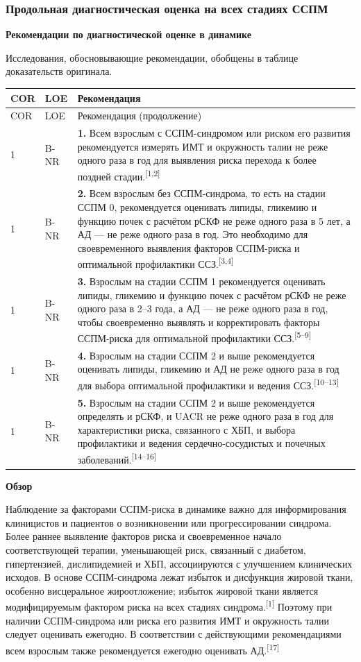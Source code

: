 \documentclass[11pt,a4paper]{article}
\newcommand{\src}[1]{\textsuperscript{[#1]}}
\newcommand{\heading}[1]{\par\medskip\textbf{#1}\par}
\begin{document}
\subsubsection{Продольная диагностическая оценка на всех стадиях ССПМ}
\heading{Рекомендации по диагностической оценке в динамике}
Исследования, обосновывающие рекомендации, обобщены в таблице доказательств оригинала.
{\small
\begin{longtable}{P{0.07\textwidth}P{0.11\textwidth}P{0.75\textwidth}}
\toprule COR & LOE & Рекомендация\\\midrule
\endfirsthead
\toprule COR & LOE & Рекомендация (продолжение)\\\midrule
{} & B-NR & \textbf{1.} Всем взрослым с ССПМ-синдромом или риском его развития рекомендуется измерять ИМТ и окружность талии не реже одного раза в год для выявления риска перехода к более поздней стадии.\src{1,2}\\[5pt]
1 & B-NR & \textbf{2.} Всем взрослым без ССПМ-синдрома, то есть на стадии ССПМ 0, рекомендуется оценивать липиды, гликемию и функцию почек с расчётом рСКФ не реже одного раза в 5 лет, а АД --- не реже одного раза в год. Это необходимо для своевременного выявления факторов ССПМ-риска и оптимальной профилактики ССЗ.\src{3,4}\\[5pt]
1 & B-NR & \textbf{3.} Взрослым на стадии ССПМ 1 рекомендуется оценивать липиды, гликемию и функцию почек с расчётом рСКФ не реже одного раза в 2--3 года, а АД --- не реже одного раза в год, чтобы своевременно выявлять и корректировать факторы ССПМ-риска для оптимальной профилактики ССЗ.\src{5--9}\\[5pt]
1 & B-NR & \textbf{4.} Взрослым на стадии ССПМ 2 и выше рекомендуется оценивать липиды, гликемию и АД не реже одного раза в год для выбора оптимальной профилактики и ведения ССЗ.\src{10--13}\\[5pt]
1 & B-NR & \textbf{5.} Взрослым на стадии ССПМ 2 и выше рекомендуется определять и рСКФ, и UACR не реже одного раза в год для характеристики риска, связанного с ХБП, и выбора профилактики и ведения сердечно-сосудистых и почечных заболеваний.\src{14--16}\\
\bottomrule
\end{longtable}
}

\heading{Обзор}
Наблюдение за факторами ССПМ-риска в динамике важно для информирования клиницистов и пациентов о возникновении или прогрессировании синдрома. Более раннее выявление факторов риска и своевременное начало соответствующей терапии, уменьшающей риск, связанный с диабетом, гипертензией, дислипидемией и ХБП, ассоциируются с улучшением клинических исходов. В основе ССПМ-синдрома лежат избыток и дисфункция жировой ткани, особенно висцеральное жироотложение; избыток жировой ткани является модифицируемым фактором риска на всех стадиях синдрома.\src{1} Поэтому при наличии ССПМ-синдрома или риска его развития ИМТ и окружность талии следует оценивать ежегодно. В соответствии с действующими рекомендациями всем взрослым также рекомендуется ежегодно оценивать АД.\src{17}
\end{document}
